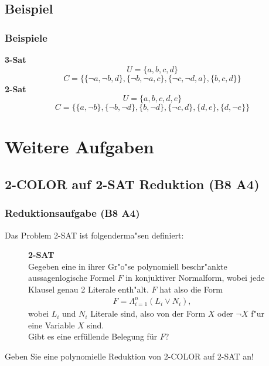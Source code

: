 \subsection{Beispiel}
\begin{frame}
	\frametitle{Beispiele}
	\textbf{3-Sat}
	\[U=\{ a,b,c,d \}\]
	\[C=\{\{\neg a,\neg b,d\},\{\neg b,\neg a,c\},\{\neg c,\neg d, a\},\{b,c,d\}\}\]
	\textbf{2-Sat}
	\[U=\{ a,b,c,d,e \}\]
	\[C=\{\{a,\neg b\},\{\neg b,\neg d\},\{b,\neg d\},\{\neg c,d\},\{d,e\},\{d,\neg e\}\}\]
\end{frame}

\section{Weitere Aufgaben}
\subsection{2-COLOR auf 2-SAT Reduktion (B8 A4)}
\begin{frame}
	\frametitle{Reduktionsaufgabe (B8 A4)}
	Das Problem 2-SAT ist folgenderma"sen definiert:\\
	\begin{figure}[ht]
	\vbox{\small
	\textbf{2-SAT}\\
	Gegeben eine in ihrer Gr"o"se polynomiell beschr"ankte aussagenlogische Formel $F$
	in konjuktiver Normalform, wobei jede Klausel genau 2 Literale enth"alt. $F$ hat
	also die Form
	\begin{eqnarray*}F = \Lambda_{i = 1}^n (L_i \vee N_i),\end{eqnarray*}
	wobei $L_i$ und $N_i$ Literale sind, also von der Form $X$ oder $\neg X$ f"ur eine
	Variable $X$ sind.\\
	Gibt es eine erfüllende Belegung für $F$?
	}
	\centerline{}
	\end{figure}
	Geben Sie eine polynomielle Reduktion von 2-COLOR auf 2-SAT an!
\end{frame}
